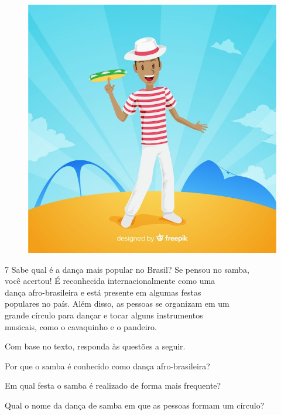 \begingroup
\begin{figure}
\includegraphics[width=.25\textwidth]{./imgs/img13.jpg}
\end{figure}

\num{7} Sabe qual é a dança mais popular no Brasil? Se pensou no samba,\\ você
  acertou! É reconhecida internacionalmente como uma\\ dança
  afro-brasileira e está presente em algumas festas\\ populares no país.
  Além disso, as pessoas se organizam em um\\ grande círculo para dançar e
  tocar alguns instrumentos\\ musicais, como o cavaquinho e o pandeiro.


\noindent{}Com base no texto, responda às questões a seguir.

\endgroup

\begin{escolha}
\item Por que o samba é conhecido como dança afro-brasileira?\\

\item Em qual festa o samba é realizado de forma mais frequente?\\

\item Qual o nome da dança de samba em que as pessoas formam um círculo?\\
\end{escolha}


